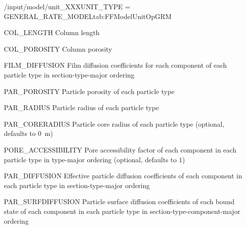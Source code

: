 \begin{condsubgroup}{/input/model/unit\_XXX}{UNIT\_TYPE = GENERAL\_RATE\_MODEL}{tab:FFModelUnitOpGRM}
  \begin{dataset}[unit=\si{\metre},type=double,range={$> 0$},length={1}]{COL\_LENGTH}
    Column length
  \end{dataset}
  \begin{dataset}[unit=--,type=double,range={$[0,1]$},length={1}]{COL\_POROSITY}
    Column porosity
  \end{dataset}
  \begin{dataset}[unit=\si{\metre\per\second},type=double,range={$\geq 0$},length={$\texttt{NPARTYPE} \cdot \texttt{NCOMP}$ / $\texttt{NPARTYPE} \cdot \texttt{NCOMP} \cdot \texttt{NSEC}$}]{FILM\_DIFFUSION}
    Film diffusion coefficients for each component of each particle type in section-type-major ordering
  \end{dataset}
  \begin{dataset}[unit=--,type=double,range={$[0,1]$},length={\texttt{NPARTYPE}}]{PAR\_POROSITY}
    Particle porosity of each particle type
  \end{dataset}
  \begin{dataset}[unit=\si{\metre},type=double,range={$>0$},length={\texttt{NPARTYPE}}]{PAR\_RADIUS}
    Particle radius of each particle type
  \end{dataset}
  \begin{dataset}[unit=\si{\metre},type=double,range={$[0, \texttt{PAR\_RADIUS})$},length={\texttt{NPARTYPE}}]{PAR\_CORERADIUS}
    Particle core radius of each particle type (optional, defaults to \SI{0}{\metre})
  \end{dataset}
  \begin{dataset}[unit=--,type=double,range={$(0, 1]$},length={$\texttt{NPARTYPE} \cdot \texttt{NCOMP}$}]{PORE\_ACCESSIBILITY}
    Pore accessibility factor of each component in each particle type in type-major ordering (optional, defaults to $1$)
  \end{dataset}
  \begin{dataset}[unit=\si{\square\metre\of{MP}\per\second},type=double,range={$\geq 0$},length={$\texttt{NPARTYPE} \cdot \texttt{NCOMP}$ / $\texttt{NSEC} \cdot \texttt{NPARTYPE} \cdot \texttt{NCOMP}$}]{PAR\_DIFFUSION}
    Effective particle diffusion coefficients of each component in each particle type in section-type-major ordering
  \end{dataset}
  \begin{dataset}[unit=\si{\square\metre\of{SP}\per\second},type=double,range={$\geq 0$},length={$\texttt{NTOTALBND}$ / $\texttt{NSEC} \cdot \texttt{NTOTALBND}$}]{PAR\_SURFDIFFUSION}
    Particle surface diffusion coefficients of each bound state of each component in each particle type in section-type-component-major ordering

\end{dataset}
\end{condsubgroup}
